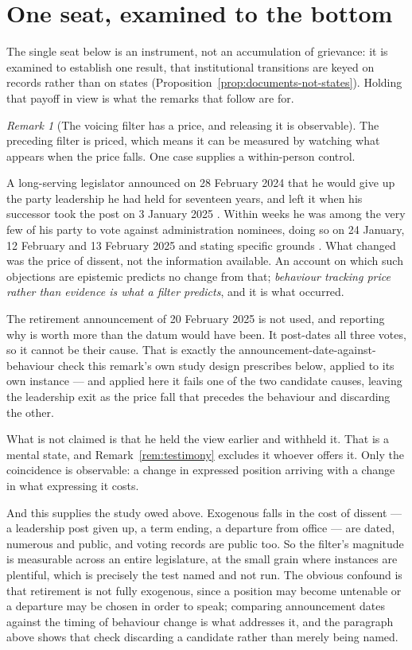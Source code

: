 \documentclass[11pt,a4paper]{article}
\theoremstyle{remark}
\newtheorem{remark}[definition]{Remark}
\begin{document}
\section{One seat, examined to the bottom}\label{sec:seat}
The single seat below is an instrument, not an accumulation of grievance: it is examined to establish
one result, that institutional transitions are keyed on records rather than on states
(Proposition~\ref{prop:documents-not-states}). Holding that payoff in view is what the remarks that
follow are for.
\begin{remark}[The voicing filter has a price, and releasing it is observable]\label{rem:release}
The preceding filter is priced, which means it can be measured by watching what appears when the price
falls. One case supplies a within-person control.

A long-serving legislator announced on 28 February 2024 that he would give up the party leadership he had
held for seventeen years, and left it when his successor took the post on 3 January 2025
\citep{leader2024}. Within weeks he was among the very few of his party to vote against administration
nominees, doing so on 24 January, 12 February and 13 February 2025 and stating specific grounds
\citep{nominees2025}. What changed was the price of dissent, not the information available. An
account on which such objections are epistemic predicts no change from that; \emph{behaviour tracking
price rather than evidence is what a filter predicts}, and it is what occurred.

The retirement announcement of 20 February 2025 \citep{retire2025} is not used, and reporting why is
worth more than the datum would have been. It post-dates all three votes, so it cannot be their cause.
That is exactly the announcement-date-against-behaviour check this remark's own study design prescribes
below, applied to its own instance --- and applied here it fails one of the two candidate causes,
leaving the leadership exit as the price fall that precedes the behaviour and discarding the other.

What is not claimed is that he held the view earlier and withheld it. That is a mental state, and
Remark~\ref{rem:testimony} excludes it whoever offers it. Only the coincidence is observable: a
change in expressed position arriving with a change in what expressing it costs.

And this supplies the study owed above. Exogenous falls in the cost of dissent --- a leadership post
given up, a term ending, a departure from office --- are dated, numerous and public, and voting records
are public too. So the filter's magnitude is measurable across an entire legislature, at the small
grain where instances are plentiful, which is precisely the test named and not run. The obvious
confound is that retirement is not fully exogenous, since a position may become untenable or a departure
may be chosen in order to speak; comparing announcement dates against the timing of behaviour change is
what addresses it, and the paragraph above shows that check discarding a candidate rather than merely
being named.


\end{remark}
\end{document}
